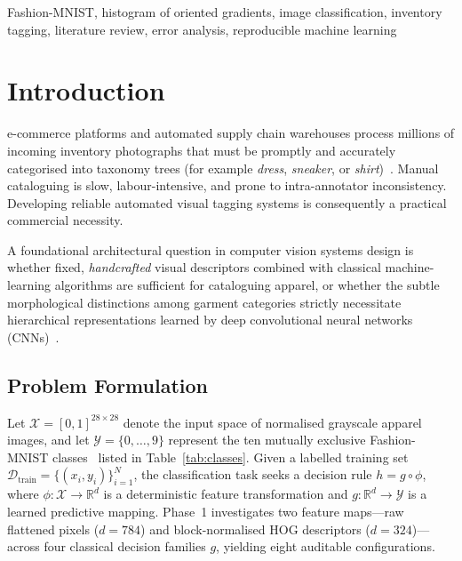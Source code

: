 \documentclass[conference]{IEEEtran}
\newcommand{\R}{\mathbb{R}}
\begin{document}
\begin{IEEEkeywords}
Fashion-MNIST, histogram of oriented gradients, image classification,
inventory tagging, literature review, error analysis, reproducible machine
learning
\end{IEEEkeywords}

\section{Introduction}
\label{sec:intro}

 e-commerce platforms and automated supply chain
warehouses process millions of incoming inventory photographs that must be
promptly and accurately categorised into taxonomy trees (for example
\emph{dress}, \emph{sneaker}, or \emph{shirt})~\cite{liu2016deepfashion}.
Manual cataloguing is slow, labour-intensive, and prone to intra-annotator
inconsistency. Developing reliable automated visual tagging systems is
consequently a practical commercial necessity.

A foundational architectural question in computer vision systems design is
whether fixed, \emph{handcrafted} visual descriptors combined with classical
machine-learning algorithms are sufficient for cataloguing apparel, or
whether the subtle morphological distinctions among garment categories
strictly necessitate hierarchical representations learned by deep
convolutional neural networks (CNNs)~\cite{krizhevsky2012imagenet}.

\subsection{Problem Formulation}
Let $\mathcal{X} = [0,1]^{28\times 28}$ denote the input space of
normalised grayscale apparel images, and let $\mathcal{Y} = \{0,\dots,9\}$
represent the ten mutually exclusive Fashion-MNIST
classes~\cite{xiao2017fashion} listed in Table~\ref{tab:classes}. Given a
labelled training set $\mathcal{D}_{\text{train}} = \{(x_i,
y_i)\}_{i=1}^{N}$, the classification task seeks a decision rule
$h = g \circ \phi$, where $\phi:\mathcal{X}\to\R^{d}$ is a deterministic
feature transformation and $g:\R^{d}\to\mathcal{Y}$ is a learned predictive
mapping. Phase~1 investigates two feature maps---raw flattened pixels
($d=784$) and block-normalised HOG descriptors ($d=324$)---across four
classical decision families $g$, yielding eight auditable configurations.
\end{document}
